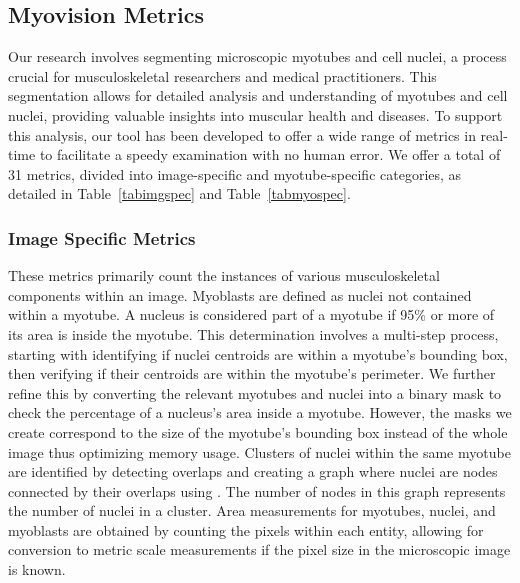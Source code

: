 \subsection{Myovision Metrics}
Our research involves segmenting microscopic myotubes and cell nuclei, a process crucial for musculoskeletal researchers and medical practitioners. This segmentation allows for detailed analysis and understanding of myotubes and cell nuclei, providing valuable insights into muscular health and diseases. To support this analysis, our tool has been developed to offer a wide range of metrics in real-time to facilitate a speedy examination with no human error. We offer a total of 31 metrics, divided into image-specific and myotube-specific categories, as detailed in Table~\ref{tabimgspec} and Table~\ref{tabmyospec}.
\subsubsection{Image Specific Metrics}
These metrics primarily count the instances of various musculoskeletal components within an image. Myoblasts are defined as nuclei not contained within a myotube. A nucleus is considered part of a myotube if 95\% or more of its area is inside the myotube. This determination involves a multi-step process, starting with identifying if nuclei centroids are within a myotube's bounding box, then verifying if their centroids are within the myotube's perimeter. We further refine this by converting the relevant myotubes and nuclei into a binary mask to check the percentage of a nucleus's area inside a myotube. However, the masks we create correspond to the size of the myotube’s bounding box instead of the whole image thus optimizing memory usage. Clusters of nuclei within the same myotube are identified by detecting overlaps and creating a graph where nuclei are nodes connected by their overlaps using \cite{hagberg2008exploring, hagberg2020networkx}. The number of nodes in this graph represents the number of nuclei in a cluster. Area measurements for myotubes, nuclei, and myoblasts are obtained by counting the pixels within each entity, allowing for conversion to metric scale measurements if the pixel size in the microscopic image is known.
